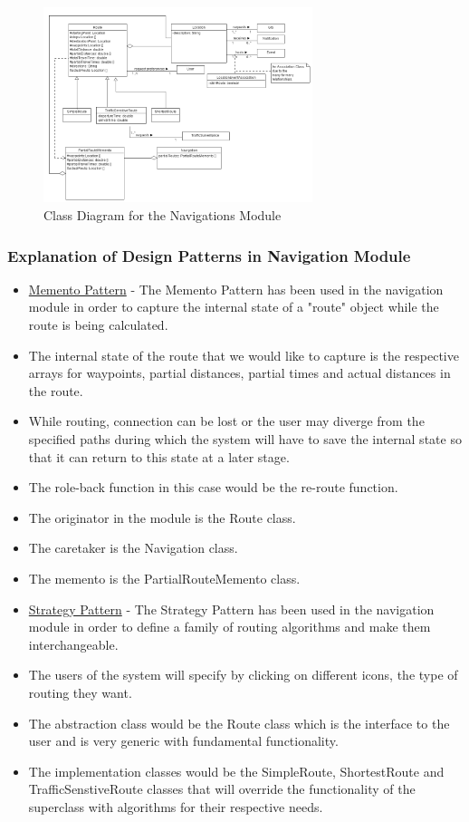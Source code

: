 \documentclass[runningheads,a4paper]{article}
\begin{document}
\begin{figure}[H]
   	\centering
   	\includegraphics[width=0.7\textwidth]{Navigation-Module-Class-Diagram.png}
   	\caption{Class Diagram for the Navigations Module}
\end{figure}

\subsubsection {Explanation of Design Patterns in Navigation Module}
\begin{itemize}

\item \underline{Memento Pattern} - The Memento Pattern has been used in the navigation module in order to capture the internal state of a "route" object while the route is being calculated.
\item The internal state of the route that we would like to capture is the respective arrays for waypoints, partial distances, partial times and actual distances in the route. 
\item While routing, connection can be lost or the user may diverge from the specified paths during which the system will have to save the internal state so that it can return to this state at a later stage.
\item The role-back function in this case would be the re-route function.
\item The originator in the module is the Route class.
\item The caretaker is the Navigation class.
\item The memento is the PartialRouteMemento class.

\item \underline{Strategy Pattern} - The Strategy Pattern has been used in the navigation module in order to define a family of routing algorithms and make them interchangeable.
\item The users of the system will specify by clicking on different icons, the type of routing they want.
\item The abstraction class would be the Route class which is the interface to the user and is very generic with fundamental functionality.
\item The implementation classes would be the SimpleRoute, ShortestRoute and TrafficSenstiveRoute classes that will override the functionality of the superclass with algorithms for their respective needs.

\end{itemize}
\end{document}
